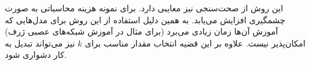 این روش از صحت‌سنجی نیز معایبی دارد. برای نمونه هزینه محاسباتی به صورت چشمگیری افزایش می‌یابد. به همین دلیل استفاده از این روش برای مدل‌هایی که آموزش آن‌ها زمان زیادی می‌برد (برای مثال در آموزش شبکه‌های عصبی ژرف) امکان‌پذیر نیست. علاوه بر این قضیه انتخاب مقدار مناسب برای $k$ نیز می‌تواند تبدیل به کار دشواری شود.

